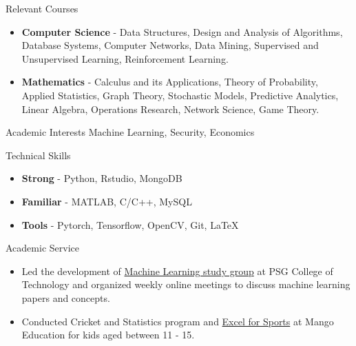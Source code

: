 \documentclass{resume} %
\begin{document}
\begin{rSection}{Relevant Courses}
\begin{itemize}[leftmargin=*]
\itemsep -0.5em 
\item \textbf{Computer Science} - Data Structures, Design and Analysis of Algorithms, Database Systems, Computer Networks, Data Mining, Supervised and Unsupervised Learning, Reinforcement Learning.
\item \textbf{Mathematics} - Calculus and its Applications, Theory of Probability, Applied Statistics, Graph Theory, Stochastic Models, Predictive Analytics, Linear Algebra, Operations Research, Network Science, Game Theory.
\end{itemize}
\end{rSection}

\begin{rSection}{Academic Interests}
Machine Learning, Security, Economics
\end{rSection}

\begin{rSection}{Technical Skills}
\begin{itemize}[leftmargin=*]
\itemsep -0.5em 
\item \textbf{Strong} - Python, Rstudio, MongoDB
\item \textbf{Familiar} - MATLAB, C/C++, MySQL
\item \textbf{Tools} - Pytorch, Tensorflow, OpenCV, Git, \LaTeX
\end{itemize}
\end{rSection}

\begin{rSection}{Academic Service}
\vspace*{0.1in}
\begin{itemize}[leftmargin=*]
\item Led the development of \href{https://groups.google.com/g/psg-ml-seminar}{Machine Learning study group} at PSG College of Technology and organized weekly online meetings to discuss machine learning papers and concepts.
\item Conducted Cricket and Statistics program and \href{https://themango.co/programs/excel-with-sports/}{Excel for Sports} at Mango Education for kids aged between 11 - 15.
\end{itemize}
\end{rSection}
\end{document}
